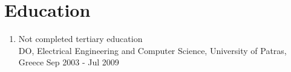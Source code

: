 \documentclass{CVSoftwareEngineer}
\begin{document}
	\section{Education}
	\begin{enumerate}[labelwidth=!, labelindent=0pt, leftmargin=*, rightmargin=15pt]
		\item[] Not completed tertiary education \\
			DO, Electrical Engineering and Computer Science, University of Patras, Greece \hfill {\scriptsize Sep 2003 - Jul 2009}
	\end{enumerate}
\end{document}

